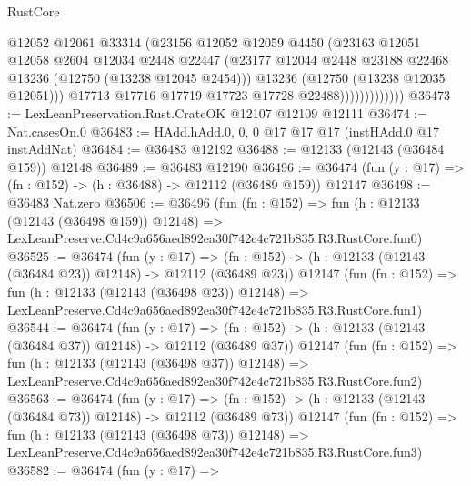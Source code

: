 \begin{lexlean}{RustCore}
\begin{coremodule}
                            @12052
                            @12061
                            @33314
                            (@23156
                              @12052
                              @12059
                              @4450
                              (@23163
                                @12051
                                @12058
                                @2604
                                @12034
                                @2448
                                @22447
                                (@23177
                                  @12044
                                  @2448
                                  @23188
                                  @22468
                                  @13236
                                  (@12750 (@13238 @12045 @2454)))
                                @13236
                                (@12750 (@13238 @12035 @12051)))
                              @17713
                              @17716
                              @17719
                              @17723
                              @17728
                              @22488)))))))))))))
@36473 := LexLeanPreservation.Rust.CrateOK @12107 @12109 @12111
@36474 := Nat.casesOn.{0}
@36483 := HAdd.hAdd.{0, 0, 0} @17 @17 @17 (instHAdd.{0} @17 instAddNat)
@36484 := @36483 @12192
@36488 := @12133 (@12143 (@36484 @159)) @12148
@36489 := @36483 @12190
@36496 := @36474 (fun (y : @17) => (fn : @152) -> (h : @36488) -> @12112 (@36489 @159)) @12147
@36498 := @36483 Nat.zero
@36506 := @36496
    (fun (fn : @152) =>
    fun (h : @12133 (@12143 (@36498 @159)) @12148) =>
    LexLeanPreserve.Cd4c9a656aed892ea30f742e4c721b835.R3.RustCore.fun0)
@36525 := @36474
    (fun (y : @17) =>
    (fn : @152) -> (h : @12133 (@12143 (@36484 @23)) @12148) -> @12112 (@36489 @23))
    @12147
    (fun (fn : @152) =>
    fun (h : @12133 (@12143 (@36498 @23)) @12148) =>
    LexLeanPreserve.Cd4c9a656aed892ea30f742e4c721b835.R3.RustCore.fun1)
@36544 := @36474
    (fun (y : @17) =>
    (fn : @152) -> (h : @12133 (@12143 (@36484 @37)) @12148) -> @12112 (@36489 @37))
    @12147
    (fun (fn : @152) =>
    fun (h : @12133 (@12143 (@36498 @37)) @12148) =>
    LexLeanPreserve.Cd4c9a656aed892ea30f742e4c721b835.R3.RustCore.fun2)
@36563 := @36474
    (fun (y : @17) =>
    (fn : @152) -> (h : @12133 (@12143 (@36484 @73)) @12148) -> @12112 (@36489 @73))
    @12147
    (fun (fn : @152) =>
    fun (h : @12133 (@12143 (@36498 @73)) @12148) =>
    LexLeanPreserve.Cd4c9a656aed892ea30f742e4c721b835.R3.RustCore.fun3)
@36582 := @36474
    (fun (y : @17) =>

\end{coremodule}
\end{lexlean}

